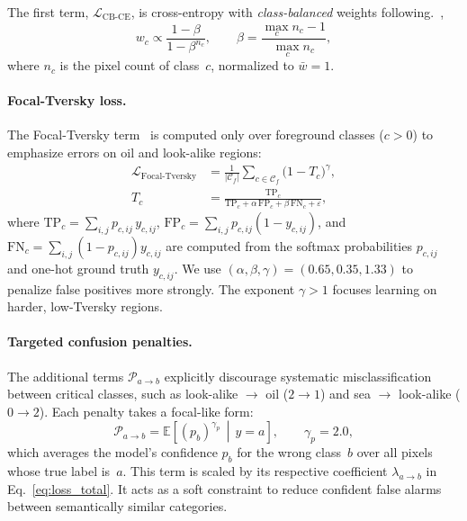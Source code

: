 \documentclass[12pt]{article}
\begin{document}
The first term, $\mathcal{L}_{\mathrm{CB\mbox{-}CE}}$, is cross-entropy with \emph{class-balanced} weights
following.~\cite{cui2019classbalanced},
\[
w_c \propto \frac{1-\beta}{1-\beta^{n_c}}, 
\qquad
\beta = \frac{\max_c n_c - 1}{\max_c n_c},
\]
where $n_c$ is the pixel count of class~$c$, normalized to $\bar{w}=1$.

\paragraph{Focal-Tversky loss.}
The Focal-Tversky term~\cite{abraham2019focaltversky,salehi2017tversky} is computed only over foreground classes
($c>0$) to emphasize errors on oil and look-alike regions:
\begin{align}
\label{eq:focal_tversky}
\mathcal{L}_{\mathrm{Focal\mbox{-}Tversky}}
 &= \frac{1}{|\mathcal{C}_f|}
    \sum_{c\in\mathcal{C}_f}
    \big(1 - T_c\big)^{\gamma}, \\[0.3em]
T_c &= \frac{\mathrm{TP}_c}
           {\mathrm{TP}_c + \alpha\,\mathrm{FP}_c + \beta\,\mathrm{FN}_c + \varepsilon},
\end{align}
where $\mathrm{TP}_c = \sum_{i,j} p_{c,ij}\,y_{c,ij}$,
$\mathrm{FP}_c = \sum_{i,j} p_{c,ij}(1-y_{c,ij})$,
and $\mathrm{FN}_c = \sum_{i,j} (1-p_{c,ij})y_{c,ij}$ are computed from the
softmax probabilities $p_{c,ij}$ and one-hot ground truth $y_{c,ij}$.
We use $(\alpha,\beta,\gamma)=(0.65,0.35,1.33)$ to penalize false positives more strongly.
The exponent $\gamma>1$ focuses learning on harder, low-Tversky regions.

\paragraph{Targeted confusion penalties.}
The additional terms $\mathcal{P}_{a\to b}$ explicitly discourage systematic misclassification between critical classes,
such as look-alike $\rightarrow$ oil ($2\!\to\!1$) and sea $\rightarrow$ look-alike ($0\!\to\!2$).
Each penalty takes a focal-like form:
\begin{equation}
\label{eq:confusion_penalty}
\mathcal{P}_{a\to b}
 = \mathbb{E}\!\left[(p_b)^{\gamma_{\!p}} \,\middle|\, y=a\right],
\qquad
\gamma_{\!p}=2.0,
\end{equation}
which averages the model’s confidence $p_b$ for the wrong class~$b$ over all pixels
whose true label is~$a$. 
This term is scaled by its respective coefficient $\lambda_{a\to b}$ in Eq.~\ref{eq:loss_total}.
It acts as a soft constraint to reduce confident false alarms between semantically similar categories.
\end{document}
